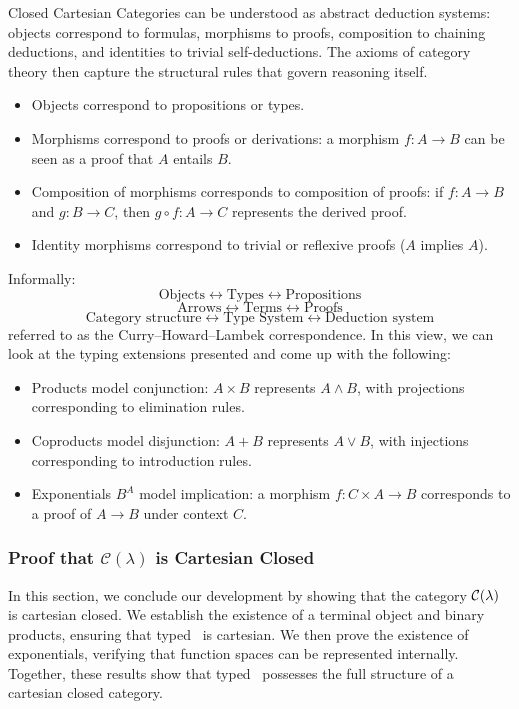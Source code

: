 Closed Cartesian Categories can be understood as abstract deduction systems: objects correspond to formulas, morphisms to proofs, composition to chaining deductions, and identities to trivial self-deductions. The axioms of category theory then capture the structural rules that govern reasoning itself.

\begin{itemize}
\item Objects correspond to propositions or types.
\item Morphisms correspond to proofs or derivations: a morphism 
  $f: A \to B$ can be seen as a proof that $A$ entails $B$.
\item Composition of morphisms corresponds to composition of proofs: 
  if $f: A \to B$ and $g: B \to C$, then $g \circ f: A \to C$ represents the derived proof.
\item Identity morphisms correspond to trivial or reflexive proofs ($A$ implies $A$).
\end{itemize}
Informally:
\[
  \text{Objects} \leftrightarrow \text{Types} \leftrightarrow \text{Propositions}
\]
\[
  \text{Arrows} \leftrightarrow \text{Terms} \leftrightarrow \text{Proofs}
\]
\[
  \text{Category structure} \leftrightarrow \text{Type System} \leftrightarrow \text{Deduction system}
\]
referred to as the Curry--Howard--Lambek correspondence. In this view, we can look at the typing extensions presented and come up with the following:

\begin{itemize}
\item Products model conjunction: $A \times B$ represents $A \wedge B$, with projections corresponding to elimination rules.
\item Coproducts model disjunction: $A + B$ represents $A \vee B$, with injections corresponding to introduction rules.
\item Exponentials $B^A$ model implication: a morphism $f: C \times A \to B$ corresponds to a proof of $A \to B$ under context $C$.
\end{itemize}

\subsubsection{\centering Proof that $\mathcal{C}(\lambda)$ is Cartesian Closed}

In this section, we conclude our development by showing that the category $\mathcal{C}(\lambda)$ is cartesian closed.
We establish the existence of a terminal object and binary products, ensuring that typed \lcalc \ is cartesian.
We then prove the existence of exponentials, verifying that function spaces can be represented internally.
Together, these results show that typed \lcalc \ possesses the full structure of a cartesian closed category.

